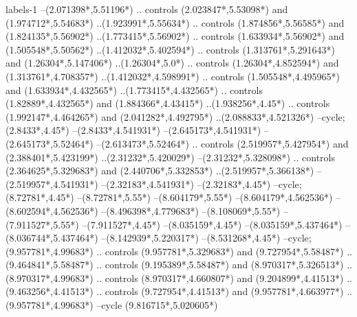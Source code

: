 {\begin{scope}[x=1mm,y=1mm,line width=\SCstroke mm,line cap=round,line join=round]
\begin{SCpart}{labels-1}
--({2.071398*\SCF},{5.51196*\SCF})
.. controls ({2.023847*\SCF},{5.53098*\SCF}) and ({1.974712*\SCF},{5.54683*\SCF}) ..({1.923991*\SCF},{5.55634*\SCF})
.. controls ({1.874856*\SCF},{5.56585*\SCF}) and ({1.824135*\SCF},{5.56902*\SCF}) ..({1.773415*\SCF},{5.56902*\SCF})
.. controls ({1.633934*\SCF},{5.56902*\SCF}) and ({1.505548*\SCF},{5.50562*\SCF}) ..({1.412032*\SCF},{5.402594*\SCF})
.. controls ({1.313761*\SCF},{5.291643*\SCF}) and ({1.26304*\SCF},{5.147406*\SCF}) ..({1.26304*\SCF},{5.0*\SCF})
.. controls ({1.26304*\SCF},{4.852594*\SCF}) and ({1.313761*\SCF},{4.708357*\SCF}) ..({1.412032*\SCF},{4.598991*\SCF})
.. controls ({1.505548*\SCF},{4.495965*\SCF}) and ({1.633934*\SCF},{4.432565*\SCF}) ..({1.773415*\SCF},{4.432565*\SCF})
.. controls ({1.82889*\SCF},{4.432565*\SCF}) and ({1.884366*\SCF},{4.43415*\SCF}) ..({1.938256*\SCF},{4.45*\SCF})
.. controls ({1.992147*\SCF},{4.464265*\SCF}) and ({2.041282*\SCF},{4.492795*\SCF}) ..({2.088833*\SCF},{4.521326*\SCF})
--cycle;
 ({2.8433*\SCF},{4.45*\SCF})
--({2.8433*\SCF},{4.541931*\SCF})
--({2.645173*\SCF},{4.541931*\SCF})
--({2.645173*\SCF},{5.52464*\SCF})
--({2.613473*\SCF},{5.52464*\SCF})
.. controls ({2.519957*\SCF},{5.427954*\SCF}) and ({2.388401*\SCF},{5.423199*\SCF}) ..({2.31232*\SCF},{5.420029*\SCF})
--({2.31232*\SCF},{5.328098*\SCF})
.. controls ({2.364625*\SCF},{5.329683*\SCF}) and ({2.440706*\SCF},{5.332853*\SCF}) ..({2.519957*\SCF},{5.366138*\SCF})
--({2.519957*\SCF},{4.541931*\SCF})
--({2.32183*\SCF},{4.541931*\SCF})
--({2.32183*\SCF},{4.45*\SCF})
--cycle; ({8.72781*\SCF},{4.45*\SCF})
--({8.72781*\SCF},{5.55*\SCF})
--({8.604179*\SCF},{5.55*\SCF})
--({8.604179*\SCF},{4.562536*\SCF})
--({8.602594*\SCF},{4.562536*\SCF})
--({8.496398*\SCF},{4.779683*\SCF})
--({8.108069*\SCF},{5.55*\SCF})
--({7.911527*\SCF},{5.55*\SCF})
--({7.911527*\SCF},{4.45*\SCF})
--({8.035159*\SCF},{4.45*\SCF})
--({8.035159*\SCF},{5.437464*\SCF})
--({8.036744*\SCF},{5.437464*\SCF})
--({8.142939*\SCF},{5.220317*\SCF})
--({8.531268*\SCF},{4.45*\SCF})
--cycle;
 ({9.957781*\SCF},{4.99683*\SCF})
.. controls ({9.957781*\SCF},{5.329683*\SCF}) and ({9.727954*\SCF},{5.58487*\SCF}) ..({9.464841*\SCF},{5.58487*\SCF})
.. controls ({9.195389*\SCF},{5.58487*\SCF}) and ({8.970317*\SCF},{5.326513*\SCF}) ..({8.970317*\SCF},{4.99683*\SCF})
.. controls ({8.970317*\SCF},{4.660807*\SCF}) and ({9.204899*\SCF},{4.41513*\SCF}) ..({9.463256*\SCF},{4.41513*\SCF})
.. controls ({9.727954*\SCF},{4.41513*\SCF}) and ({9.957781*\SCF},{4.663977*\SCF}) ..({9.957781*\SCF},{4.99683*\SCF})
--cycle
({9.816715*\SCF},{5.020605*\SCF})

\end{SCpart}
\end{scope}}
